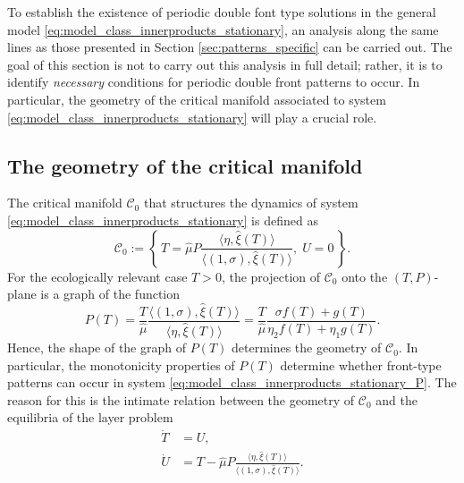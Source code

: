 \documentclass[a4paper,10pt,abstract=true,parskip=true]{scrartcl}
\theoremstyle{remark}
\numberwithin{equation}{section}
\numberwithin{thm}{section}
\begin{document}
To establish the existence of periodic double font type solutions in the general model \eqref{eq:model_class_innerproducts_stationary}, an analysis along the same lines as those presented in Section \ref{sec:patterns_specific} can be carried out. The goal of this section is not to carry out this analysis in full detail; rather, it is to identify \emph{necessary} conditions for periodic double front patterns to occur. In particular, the geometry of the critical manifold associated to system \eqref{eq:model_class_innerproducts_stationary} will play a crucial role.

\subsection{The geometry of the critical manifold}
The critical manifold $\mathcal{C}_0$ that structures the dynamics of system \eqref{eq:model_class_innerproducts_stationary} is defined as
\begin{equation}
    \mathcal{C}_0 := \left\{\,T = \hat{\mu} P \frac{\langle \eta, \hat{\xi}(T) \rangle}{\langle (1,\sigma), \hat{\xi}(T) \rangle} ,\;U = 0\,\right\}.
\end{equation}
For the ecologically relevant case $T>0$, the projection of $\mathcal{C}_0$ onto the $(T,P)$-plane is a graph of the function
\begin{equation}\label{eq:P(T)}
    P(T) = \frac{T}{\hat{\mu}}\frac{\langle (1,\sigma), \hat{\xi}(T) \rangle}{\langle \eta, \hat{\xi}(T) \rangle} = \frac{T}{\hat{\mu}} \frac{\sigma f(T)+g(T)}{\eta_2 f(T)+\eta_1 g(T)}.
\end{equation}
Hence, the shape of the graph of $P(T)$ determines the geometry of $\mathcal{C}_0$. In particular, the monotonicity properties of $P(T)$ determine whether front-type patterns can occur in system \eqref{eq:model_class_innerproducts_stationary_P}. The reason for this is the intimate relation between the geometry of $\mathcal{C}_0$ and the equilibria of the layer problem
\begin{subequations}\label{eq:general_layp}
    \begin{align}
        \dot{T} &= U,\\
        \dot{U} &= T- \hat{\mu} P \frac{\langle \eta, \hat{\xi}(T) \rangle}{\langle (1,\sigma), \hat{\xi}(T) \rangle}.
    \end{align}
\end{subequations}
\end{document}
